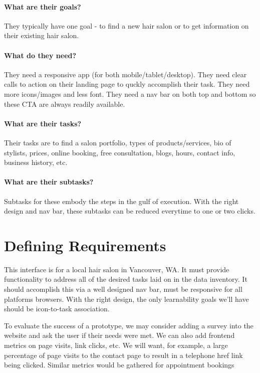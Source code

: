 \paragraph{What are their goals?}
They typically have one goal - to find a new hair salon or to get information on their existing hair salon.

\paragraph{What do they need?}
They need a responsive app (for both mobile/tablet/desktop). They need clear calls to action on their landing page to quckly accomplish their task. They need more icons/images and less font. They need a nav bar on both top and bottom so these CTA are always readily available.

\paragraph{What are their tasks?}
Their tasks are to find a salon portfolio, types of products/services, bio of stylists, prices, online booking, free consultation, blogs, hours, contact info, business history, etc.

\paragraph{What are their subtasks?}
Subtasks for these embody the steps in the gulf of execution. With the right design and nav bar, these subtasks can be reduced everytime to one or two clicks.


\section{Defining Requirements}
This interface is for a local hair salon in Vancouver, WA. It must provide functionality to address all of the desired tasks laid on in the data inventory. It should accomplish this via a well designed nav bar, must be responsive for all platforms browsers. With the right design, the only learnability goals we'll have should be icon-to-task association.

To evaluate the success of a prototype, we may consider adding a survey into the website and ask the user if their needs were met. We can also add frontend metrics on page visits, link clicks, etc. We will want, for example, a large percentage of page visits to the contact page to result in a telephone href link being clicked. Similar metrics would be gathered for appointment bookings


